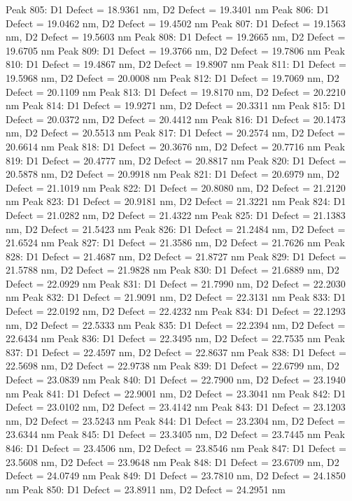 \documentclass{article}
\begin{document}
Peak 805: D1 Defect = 18.9361 nm, D2 Defect = 19.3401 nm
Peak 806: D1 Defect = 19.0462 nm, D2 Defect = 19.4502 nm
Peak 807: D1 Defect = 19.1563 nm, D2 Defect = 19.5603 nm
Peak 808: D1 Defect = 19.2665 nm, D2 Defect = 19.6705 nm
Peak 809: D1 Defect = 19.3766 nm, D2 Defect = 19.7806 nm
Peak 810: D1 Defect = 19.4867 nm, D2 Defect = 19.8907 nm
Peak 811: D1 Defect = 19.5968 nm, D2 Defect = 20.0008 nm
Peak 812: D1 Defect = 19.7069 nm, D2 Defect = 20.1109 nm
Peak 813: D1 Defect = 19.8170 nm, D2 Defect = 20.2210 nm
Peak 814: D1 Defect = 19.9271 nm, D2 Defect = 20.3311 nm
Peak 815: D1 Defect = 20.0372 nm, D2 Defect = 20.4412 nm
Peak 816: D1 Defect = 20.1473 nm, D2 Defect = 20.5513 nm
Peak 817: D1 Defect = 20.2574 nm, D2 Defect = 20.6614 nm
Peak 818: D1 Defect = 20.3676 nm, D2 Defect = 20.7716 nm
Peak 819: D1 Defect = 20.4777 nm, D2 Defect = 20.8817 nm
Peak 820: D1 Defect = 20.5878 nm, D2 Defect = 20.9918 nm
Peak 821: D1 Defect = 20.6979 nm, D2 Defect = 21.1019 nm
Peak 822: D1 Defect = 20.8080 nm, D2 Defect = 21.2120 nm
Peak 823: D1 Defect = 20.9181 nm, D2 Defect = 21.3221 nm
Peak 824: D1 Defect = 21.0282 nm, D2 Defect = 21.4322 nm
Peak 825: D1 Defect = 21.1383 nm, D2 Defect = 21.5423 nm
Peak 826: D1 Defect = 21.2484 nm, D2 Defect = 21.6524 nm
Peak 827: D1 Defect = 21.3586 nm, D2 Defect = 21.7626 nm
Peak 828: D1 Defect = 21.4687 nm, D2 Defect = 21.8727 nm
Peak 829: D1 Defect = 21.5788 nm, D2 Defect = 21.9828 nm
Peak 830: D1 Defect = 21.6889 nm, D2 Defect = 22.0929 nm
Peak 831: D1 Defect = 21.7990 nm, D2 Defect = 22.2030 nm
Peak 832: D1 Defect = 21.9091 nm, D2 Defect = 22.3131 nm
Peak 833: D1 Defect = 22.0192 nm, D2 Defect = 22.4232 nm
Peak 834: D1 Defect = 22.1293 nm, D2 Defect = 22.5333 nm
Peak 835: D1 Defect = 22.2394 nm, D2 Defect = 22.6434 nm
Peak 836: D1 Defect = 22.3495 nm, D2 Defect = 22.7535 nm
Peak 837: D1 Defect = 22.4597 nm, D2 Defect = 22.8637 nm
Peak 838: D1 Defect = 22.5698 nm, D2 Defect = 22.9738 nm
Peak 839: D1 Defect = 22.6799 nm, D2 Defect = 23.0839 nm
Peak 840: D1 Defect = 22.7900 nm, D2 Defect = 23.1940 nm
Peak 841: D1 Defect = 22.9001 nm, D2 Defect = 23.3041 nm
Peak 842: D1 Defect = 23.0102 nm, D2 Defect = 23.4142 nm
Peak 843: D1 Defect = 23.1203 nm, D2 Defect = 23.5243 nm
Peak 844: D1 Defect = 23.2304 nm, D2 Defect = 23.6344 nm
Peak 845: D1 Defect = 23.3405 nm, D2 Defect = 23.7445 nm
Peak 846: D1 Defect = 23.4506 nm, D2 Defect = 23.8546 nm
Peak 847: D1 Defect = 23.5608 nm, D2 Defect = 23.9648 nm
Peak 848: D1 Defect = 23.6709 nm, D2 Defect = 24.0749 nm
Peak 849: D1 Defect = 23.7810 nm, D2 Defect = 24.1850 nm
Peak 850: D1 Defect = 23.8911 nm, D2 Defect = 24.2951 nm
\end{document}
